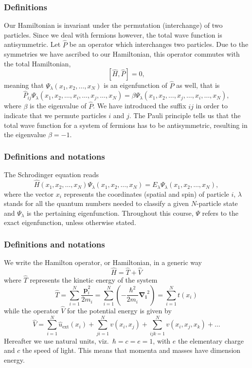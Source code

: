 \documentclass{beamer}
\begin{document}
\begin{frame}
\frametitle{Definitions}

\begin{block}{}
Our Hamiltonian is invariant under the permutation (interchange) of two particles.
Since we deal with fermions however, the total wave function is antisymmetric.
Let $\hat{P}$ be an operator which interchanges two particles.
Due to the symmetries we have ascribed to our Hamiltonian, this operator commutes with the total Hamiltonian,
\[
[\hat{H},\hat{P}] = 0,
\]
meaning that $\Psi_{\lambda}(x_1, x_2, \dots , x_N)$ is an eigenfunction of 
$\hat{P}$ as well, that is
\[
\hat{P}_{ij}\Psi_{\lambda}(x_1, x_2, \dots,x_i,\dots,x_j,\dots,x_N)=
\beta\Psi_{\lambda}(x_1, x_2, \dots,x_j,\dots,x_i,\dots,x_N),
\]
where $\beta$ is the eigenvalue of $\hat{P}$. We have introduced the suffix $ij$ in order to indicate that we permute particles $i$ and $j$.
The Pauli principle tells us that the total wave function for a system of fermions
has to be antisymmetric, resulting in the eigenvalue $\beta = -1$.   
\end{block}
\end{frame}

\begin{frame}
\frametitle{Definitions and notations}

\begin{block}{}
The Schrodinger equation reads 
\begin{equation}
\hat{H}(x_1, x_2, \dots , x_N) \Psi_{\lambda}(x_1, x_2, \dots , x_N) = 
E_\lambda  \Psi_\lambda(x_1, x_2, \dots , x_N), \label{eq:basicSE1}
\end{equation}
where the vector $x_i$ represents the coordinates (spatial and spin) of particle $i$, $\lambda$ stands  for all the quantum
numbers needed to classify a given $N$-particle state and $\Psi_{\lambda}$ is the pertaining eigenfunction.  Throughout this course,
$\Psi$ refers to the exact eigenfunction, unless otherwise stated.
\end{block}
\end{frame}

\begin{frame}
\frametitle{Definitions and notations}

\begin{block}{}
We write the Hamilton operator, or Hamiltonian,  in a generic way 
\[
	\hat{H} = \hat{T} + \hat{V} 
\]
where $\hat{T}$  represents the kinetic energy of the system
\[
	\hat{T} = \sum_{i=1}^N \frac{\mathbf{p}_i^2}{2m_i} = \sum_{i=1}^N \left( -\frac{\hbar^2}{2m_i} \mathbf{\nabla_i}^2 \right) =
		\sum_{i=1}^N t(x_i)
\]
while the operator $\hat{V}$ for the potential energy is given by
\begin{equation}
	\hat{V} = \sum_{i=1}^N \hat{u}_{\mathrm{ext}}(x_i) + \sum_{ji=1}^N v(x_i,x_j)+\sum_{ijk=1}^Nv(x_i,x_j,x_k)+\dots
\label{eq:firstv}
\end{equation}
Hereafter we use natural units, viz.~$\hbar=c=e=1$, with $e$ the elementary charge and $c$ the speed of light. This means that momenta and masses
have dimension energy. 
\end{block}
\end{frame}
\end{document}
